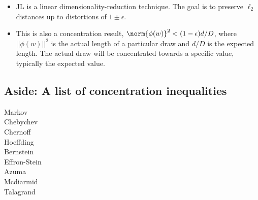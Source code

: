 \begin{itemize}
\item JL is a linear dimensionality-reduction technique. The goal is
  to preserve $\ell_{2}$ distances up to distortions of $1\pm
  \epsilon$. 

\item This is also a concentration result, $\norm{\phi(w)}^{2} <
  (1-\epsilon)d/D$, where $||\phi(w)||^{2}$ is the actual length of a
  particular draw and $d/D$ is the expected length. The actual draw
  will be concentrated towards a specific value, typically the
  expected value.  

\end{itemize}


\subsection{Aside: A list of concentration inequalities}
\begin{centering}
Markov \\
Chebychev \\
Chernoff \\
Hoeffding \\
Bernstein \\
Effron-Stein \\
Azuma \\
Mcdiarmid \\
Talagrand \\
\end{centering}
